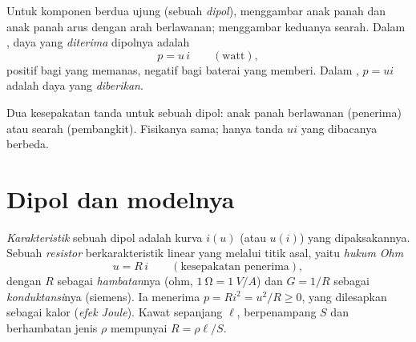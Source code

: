 \begin{notation}\label{not:b1:dc-circuits:conventions}
Untuk komponen berdua ujung (sebuah \emph{dipol}), \emph{} menggambar anak panah  dan anak panah arus dengan arah
berlawanan; \emph{} menggambar keduanya searah.
Dalam , daya yang \emph{diterima} dipolnya adalah
\[
p = u\,i \qquad (\text{watt}),
\]
positif bagi  yang memanas, negatif bagi baterai yang memberi.
Dalam , $p = ui$ adalah daya yang
\emph{diberikan}.
\end{notation}

\begin{omfigure}

{\small Dua kesepakatan tanda untuk sebuah dipol: anak panah berlawanan
(penerima) atau searah (pembangkit). Fisikanya sama; hanya tanda $ui$
yang dibacanya berbeda.}
\end{omfigure}

\section{Dipol dan modelnya}

\begin{definition}\label{def:b1:dc-circuits:resistor}
\emph{Karakteristik} sebuah dipol adalah kurva $i(u)$ (atau $u(i)$)
yang dipaksakannya. Sebuah \emph{resistor} berkarakteristik linear yang
melalui titik asal, yaitu \emph{hukum Ohm}
\[
u = R\,i \qquad (\text{kesepakatan penerima}),
\]
dengan $R$ sebagai \emph{hambatan}nya (ohm, $\qty{1}{\ohm} = \qty{1}{V/A}$) dan
$G = 1/R$ sebagai \emph{konduktansi}nya (siemens). Ia menerima $p = Ri^2 =
u^2/R \geq 0$, yang dilesapkan sebagai kalor (\emph{efek Joule}). Kawat
sepanjang $\ell$, berpenampang $S$ dan berhambatan jenis $\rho$
mempunyai $R = \rho\ell/S$.
\end{definition}

